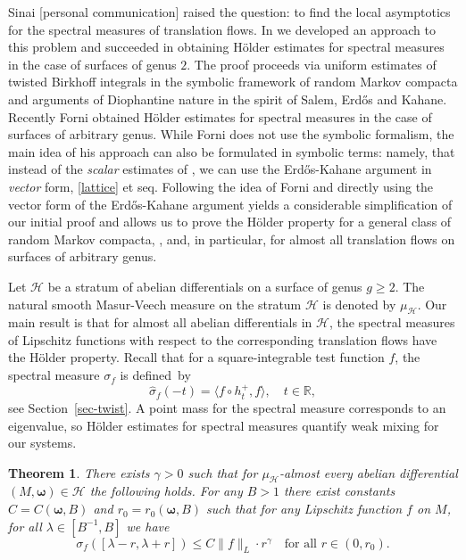 \documentclass[10pt]{amsart}
\let\mathcal\mathscr
\theoremstyle{plain}
\newtheorem{theorem}{Theorem}[section]
\theoremstyle{definition}
\newcommand{\omb}{\boldsymbol \omega}
\let\lam\lambda
\let\sig\sigma
\newcommand{\HH}{\mathcal{H}}
\newcommand{\R}{\mathbb{R}}
\newcommand\be{\begin{equation}}
\newcommand\ee{\end{equation}}
\begin{document}
Sinai [personal communication] raised the question: to find the local asymptotics for the spectral measures of translation flows.
In \cite{BuSo18a,BuSo19} we developed an approach to this problem and succeeded in obtaining Hölder estimates for spectral measures in the case of surfaces of genus $2$.
The proof proceeds via uniform estimates of twisted Birkhoff integrals
in the symbolic
framework of random Markov compacta and arguments of Diophantine nature in the spirit of Salem, Erd\H{o}s and Kahane.
Recently Forni \cite{Forni2} obtained Hölder estimates for spectral measures in the case of surfaces of arbitrary genus. While Forni does not use the symbolic formalism, the main idea of his approach can also be formulated in symbolic terms: namely, that instead of the {\it scalar} estimates of \cite{BuSo18a,BuSo19}, we can use the Erd\H{o}s-Kahane argument in {\it vector} form, \cf \eqref{lattice} et seq.
Following the idea of Forni and directly using the vector form of the Erd\H{o}s-Kahane argument yields a considerable simplification of our initial proof and allows us to prove the Hölder property for a general class of random Markov compacta, \cf \cite{Buf-umn}, and, in particular, for almost all translation flows on surfaces of arbitrary genus.

Let $\HH$ be a stratum of abelian differentials on a surface of genus $g\ge 2$. The natural smooth Masur-Veech measure on the stratum $\HH$ is denoted by $\mu_\HH$.
Our main result is
that for almost all abelian differentials in $\HH$, the spectral measures of Lipschitz functions with respect to the corresponding translation flows have the Hölder property.
Recall that for a square-integrable test function $f$, the spectral measure $\sig_f$ is defined~by\vspace*{-5pt}\enlargethispage{.5\baselineskip}%
\[
\widehat{\sig}_f(-t) = \langle f\circ h_t^+, f \rangle,\quad t\in \R,
\]
see Section~\ref{sec-twist}.
A point mass for the spectral measure corresponds to an eigenvalue, so Hölder estimates for spectral measures quantify weak mixing for our systems.


\begin{theorem}\label{main-moduli}
There exists $\gamma>0$ such that for $\mu_\HH$-almost every abelian differential $(M, \omb)\in \HH$ the following holds. For any $B>1$ there exist constants $C=C(\omb,B)$ and $r_0=r_0(\omb,B)$ such that for any Lipschitz function $f$ on $M$, for all $\lam\in [B^{-1},B]$ we have\vspace*{-5pt}
\be \label{eq-moduli}
\sig_f([\lam-r, \lam+r])\le C\|f\|_L\cdot r^\gamma\quad\text{for all } r\in (0, r_0).
\ee
\end{theorem}
\end{document}
